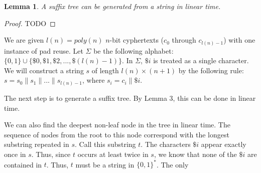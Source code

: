 \documentclass[11pt]{article}
\newtheorem{Lemma}{Lemma}
\begin{document}
\begin{Lemma}
A suffix tree can be generated from a string in linear time.
\end{Lemma}
\begin{proof}
TODO
\end{proof}

We are given $l(n) = poly(n)$ $n$-bit cyphertexts ($c_0$ through $c_{l(n) -1}$) with one instance of pad reuse. Let $\Sigma$ be the following alphabet: $\{0,1\}\cup \{\$0, \$1, \$2, ..., \$(l(n) - 1)\}$. In $\Sigma$, $\$i$ is treated as a single character. We will construct a string $s$ of length $l(n)\times (n+1)$ by the following rule: $s = s_0\|s_1\|...\|s_{l(n) -1}$, where $s_i = c_i \| \$i$.

The next step is to generate a suffix tree. By Lemma 3, this can be done in linear time. 

We can also find the deepest non-leaf node in the tree in linear time. The sequence of nodes from the root to this node correspond with the longest substring repeated in $s$. Call this substring $t$. The characters $\$i$ appear exactly once in $s$. Thus, since $t$ occurs at least twice in $s$, we know that none of the $\$i$ are contained in $t$. Thus, $t$ must be a string in $\{0,1\}^{*}$. The only
\end{document}
